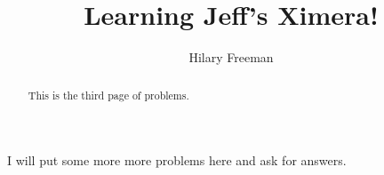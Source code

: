\documentclass[handout]{ximera}
\title{Learning Jeff's Ximera!}
\author{Hilary Freeman}
\begin{document}
\begin{abstract}
  This is the third page of problems.
\end{abstract}
\maketitle

I will put some more more problems here and ask for answers.
\end{document}
